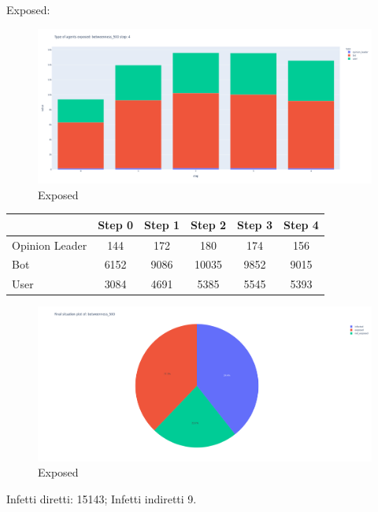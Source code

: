             Exposed:
            \begin{figure}[H]
                \includegraphics[width=16cm]{resources/charts/btw_500_bar.png}
                \caption{Exposed}
                \label{fig:btw_500_bar}
            \end{figure}
            \begin{table}[H]
                \centering
                \begin{tabular}{|l|c|c|c|c|c|}
                \hline
                               & Step 0 & Step 1 & Step 2 & Step 3 & Step 4 \\ \hline
                Opinion Leader & 144    & 172    & 180    & 174    & 156    \\ \hline
                Bot            & 6152   & 9086   & 10035  & 9852   & 9015   \\ \hline
                User           & 3084   & 4691   & 5385   & 5545   & 5393   \\ \hline
                \end{tabular}
            \end{table}
            
            \begin{figure}[H]
                \includegraphics[width=16cm]{resources/charts/btw_500_pie.png}
                \caption{Exposed}
                \label{fig:btw_500_pie}
            \end{figure}
            Infetti diretti: 15143; \newline
            Infetti indiretti 9.
            
